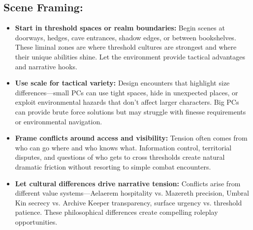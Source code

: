 \documentclass[11pt,letterpaper]{article}
\begin{document}
\subsection*{Scene Framing:}
\begin{itemize}[leftmargin=*]
\item \textbf{Start in threshold spaces or realm boundaries:} Begin scenes at doorways, hedges, cave entrances, shadow edges, or between bookshelves. These liminal zones are where threshold cultures are strongest and where their unique abilities shine. Let the environment provide tactical advantages and narrative hooks.
\item \textbf{Use scale for tactical variety:} Design encounters that highlight size differences---small PCs can use tight spaces, hide in unexpected places, or exploit environmental hazards that don't affect larger characters. Big PCs can provide brute force solutions but may struggle with finesse requirements or environmental navigation.
\item \textbf{Frame conflicts around access and visibility:} Tension often comes from who can go where and who knows what. Information control, territorial disputes, and questions of who gets to cross thresholds create natural dramatic friction without resorting to simple combat encounters.
\item \textbf{Let cultural differences drive narrative tension:} Conflicts arise from different value systems---Aelaerem hospitality vs. Mazereth precision, Umbral Kin secrecy vs. Archive Keeper transparency, surface urgency vs. threshold patience. These philosophical differences create compelling roleplay opportunities.
\end{itemize}
\end{document}
